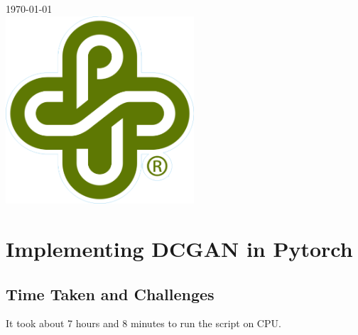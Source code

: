 \documentclass[12pt]{article}
\begin{document}
\begin{titlepage}
		
		
		{\large \today}\\[0.7cm] %
		
		
		\includegraphics[width=7cm]{PSU_LOGO.png}\\[.5cm] %
		
		
		\vfill %
		
	\end{titlepage}
	\newpage
	
	
	
	\section{Implementing DCGAN in Pytorch}
		\subsection{Time Taken and Challenges}
			It took about 7 hours and 8 minutes to run the script on CPU. 
			
\end{document}

